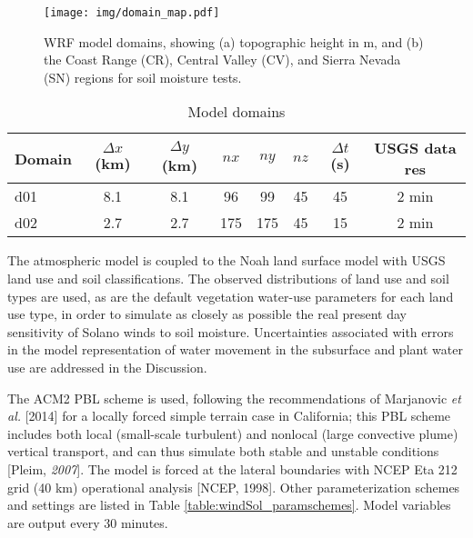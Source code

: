 \begin{figure}[here]
\texttt{[image: img/domain\_map.pdf]}
\caption{WRF model domains, showing (a) topographic height in m, and (b) the Coast Range (CR), Central Valley (CV), and Sierra Nevada (SN) regions for soil moisture tests.}
\label{fig:windSol_domainmap}
\end{figure}

\begin{table}
\begin{tabular}{ l c c c c c c c }
\hline
Domain & $\Delta x$ (km) & $\Delta y$ (km) & $nx$ & $ny$ & $nz$ & $\Delta t$ (s) & USGS data res \\ \hline
d01 & 8.1 & 8.1 & 96 & 99 & 45 & 45 & 2 min\\
d02 & 2.7 & 2.7 & 175 & 175 & 45 & 15 & 2 min\\
\hline
\end{tabular}
\caption{Model domains}
\label{table:windSol_domains}
\end{table}

The atmospheric model is coupled to the Noah land surface model with USGS land use and soil classifications.  The observed distributions of land use and soil types are used, as are the default vegetation water-use parameters for each land use type, in order to simulate as closely as possible the real present day sensitivity of Solano winds to soil moisture.  Uncertainties associated with errors in the model representation of water movement in the subsurface and plant water use are addressed in the Discussion. 

The ACM2 PBL scheme is used, following the recommendations of Marjanovic \textit{et al.} [2014] for a locally forced simple terrain case in California; this PBL scheme includes both local (small-scale turbulent) and nonlocal (large convective plume) vertical transport, and can thus simulate both stable and unstable conditions [Pleim, \textit{2007}].  The model is forced at the lateral boundaries with NCEP Eta 212 grid (40 km) operational analysis [NCEP, 1998].  Other parameterization schemes and settings are listed in Table \ref{table:windSol_paramschemes}.  Model variables are output every 30 minutes.

